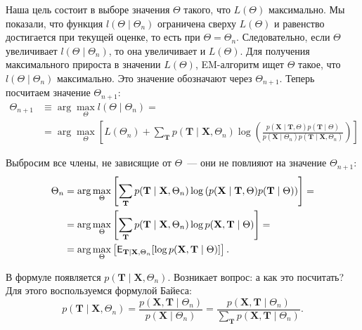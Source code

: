 Наша цель состоит в выборе значения \(\Theta\) такого, что \(L(\Theta)\) 
максимально. Мы показали, что функция \(l(\Theta \mid \Theta_{n})\) ограничена 
сверху \(L(\Theta)\) и равенство достигается при текущей оценке, то есть при 
\(\Theta = \Theta_{n}\). Следовательно, если \(\Theta\) увеличивает \(l(\Theta 
\mid \Theta_{n})\), то она увеличивает и \(L(\Theta)\). Для получения 
максимального прироста в значении \(L(\Theta)\), EM-алгоритм ищет \(\Theta\) 
такое, что \(l(\Theta \mid \Theta_{n})\) максимально. Это значение обозначают 
через \(\Theta_{n + 1}\). Теперь посчитаем значение \(\Theta_{n + 1}\):
\begin{align*}
	\Theta_{n + 1} &\equiv \arg\max_{\Theta} l(\Theta \mid \Theta_{n}) = \\
	&= \arg\max_{\Theta}\left[L(\Theta_{n}) + \sum_{\mathbf{T}} p(\mathbf{T} 
	\mid \mathbf{X}, \Theta_{n})\log\left(\frac{p(\mathbf{X} \mid \mathbf{T}, 
	\Theta) p(\mathbf{T} \mid \Theta)}{p(\mathbf{X} \mid 
	\Theta_{n})p(\mathbf{T} \mid \mathbf{X}, \Theta_{n})}\right)\right]
\end{align*}

Выбросим все члены, не зависящие от \(\Theta\)~--- они не повлияют на значение 
\(\Theta_{n + 1}\):
\begin{align*}
	\Theta_{n} &= \arg\max_{\Theta}\left[ \sum_{\mathbf{T}} p(\mathbf{T} 
	\mid \mathbf{X}, \Theta_{n})\log\left(p(\mathbf{X} \mid \mathbf{T}, \Theta) 
	p(\mathbf{T} \mid \Theta)\right)\right] = \\
	&= \arg\max_{\Theta}\left[\sum_{\mathbf{T}} p(\mathbf{T} \mid \mathbf{X}, 
	\Theta_{n})\log p(\mathbf{X}, \mathbf{T} \mid \Theta)\right] = \\
	&= \arg\max_{\Theta} \left[\E_{\mathbf{T} \mid \mathbf{X}, \Theta_{n}}[\log 
	p(\mathbf{X}, \mathbf{T} \mid \Theta)]\right].
\end{align*}

В формуле появляется \(p(\mathbf{T} \mid \mathbf{X}, \Theta_{n})\). Возникает 
вопрос: а как это посчитать? Для этого воспользуемся формулой Байеса:
\[
	p(\mathbf{T} \mid \mathbf{X}, \Theta_{n}) = \frac{p(\mathbf{X}, \mathbf{T} 
	\mid \Theta_{n})}{p(\mathbf{X} \mid \Theta_{n})} = \frac{p(\mathbf{X}, 
	\mathbf{T} \mid \Theta_{n})}{\sum_{\mathbf{T}} p(\mathbf{X}, \mathbf{T} 
	\mid \Theta_{n})}.
\]

